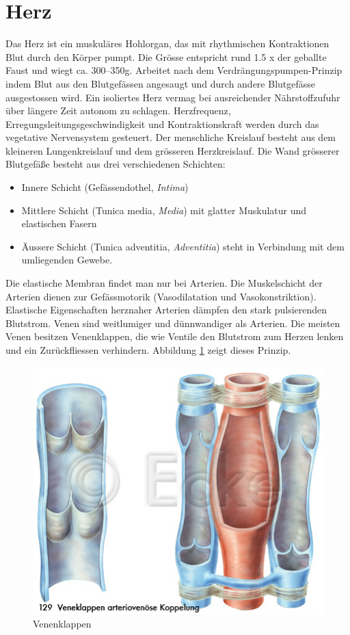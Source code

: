 \section{Herz}

Das Herz ist ein muskuläres Hohlorgan, das mit rhythmischen Kontraktionen Blut durch den Körper pumpt. Die Grösse entspricht rund 1.5 x der geballte Faust und wiegt ca. 300–350g. Arbeitet nach dem Verdrängungspumpen-Prinzip indem Blut aus den Blutgefässen angesaugt und durch andere Blutgefässe ausgestossen wird. Ein isoliertes Herz vermag bei ausreichender Nährstoffzufuhr über längere Zeit autonom zu schlagen. Herzfrequenz, Erregungsleitungsgeschwindigkeit und Kontraktionskraft werden durch das vegetative Nervensystem gesteuert. Der menschliche Kreislauf besteht aus dem kleineren Lungenkreislauf und dem grösseren Herzkreislauf. Die Wand grösserer Blutgefäße besteht aus drei verschiedenen Schichten:
\begin{itemize}
	\item Innere Schicht (Gefässendothel, \textit{Intima})
	\item Mittlere Schicht (Tunica media, \textit{Media}) mit glatter Muskulatur und elastischen Fasern
	\item Äussere Schicht (Tunica adventitia, \textit{Adventitia}) steht in Verbindung mit dem umliegenden Gewebe.
\end{itemize}
Die elastische Membran findet man nur bei Arterien. Die Muskelschicht der Arterien dienen zur Gefässmotorik (Vasodilatation und Vasokonstriktion). Elastische Eigenschaften herznaher Arterien dämpfen den stark pulsierenden Blutstrom. Venen sind weitlumiger und dünnwandiger als Arterien. Die meisten Venen besitzen Venenklappen, die wie Ventile den Blutstrom zum Herzen lenken und ein Zurückfliessen verhindern. Abbildung \ref{fig:venen} zeigt dieses Prinzip.

\begin{figure}
\centering
\includegraphics[width=0.4\linewidth]{fig/venen}
\caption{Venenklappen}
\label{fig:venen}
\end{figure}

